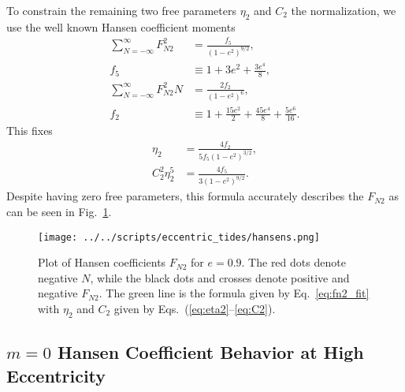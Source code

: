\documentclass[
        fleqn,
        usenatbib,
    ]{mnras}
\newcommand*{\p}[1]{\left(#1\right)}
\begin{document}
To constrain the remaining two free parameters $\eta_2$ and $C_2$ the
normalization, we use the well known Hansen coefficient moments
\citep{hut81}
\begin{align}
    \sum\limits_{N = -\infty}^\infty F_{N2}^2 &= \frac{f_5}{\p{1 - e^2}^{9/2}},
        \\
    f_5 &\equiv 1 + 3e^2 + \frac{3e^4}{8},\\
    \sum\limits_{N = -\infty}^\infty F_{N2}^2N
        &= \frac{2f_2}{\p{1 - e^2}^6},\\
    f_2 &\equiv 1 + \frac{15e^2}{2}
            + \frac{45 e^4}{8} + \frac{5e^6}{16}.
\end{align}
This fixes
\begin{align}
    \eta_2 &= \frac{4f_2}{5f_5\p{1 - e^2}^{3/2}},\label{eq:eta2}\\
    C_2^2\eta_2^5 &= \frac{4f_5}{3\p{1 - e^2}^{9/2}}.\label{eq:C2}
\end{align}
Despite having zero free parameters, this formula accurately describes the
$F_{N2}$ as can be seen in Fig.~\ref{fig:hansens}.
\begin{figure}
    \centering
    \texttt{[image: ../../scripts/eccentric\_tides/hansens.png]}
    \caption{Plot of Hansen coefficients $F_{N2}$ for $e = 0.9$. The red dots
    denote negative $N$, while the black dots and crosses denote positive and
    negative $F_{N2}$. The green line is the formula given by
    Eq.~\eqref{eq:fn2_fit} with $\eta_2$ and $C_2$ given by
    Eqs.~(\ref{eq:eta2}--\ref{eq:C2}). }\label{fig:hansens}
\end{figure}

\subsection{$m = 0$ Hansen Coefficient Behavior at High Eccentricity}
\end{document}
